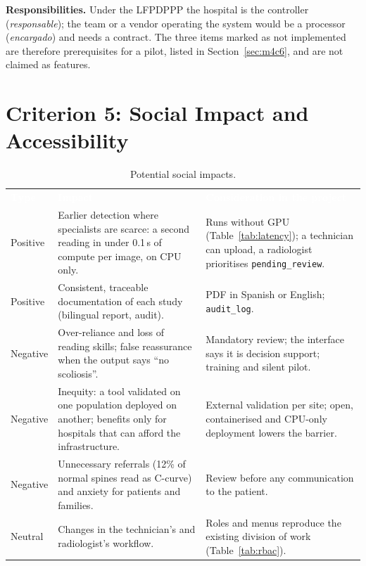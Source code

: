 \documentclass[12pt,a4paper]{article}
\newcommand{\hd}[1]{\textcolor{white}{\textbf{#1}}}
\begin{document}
\noindent\textbf{Responsibilities.} Under the LFPDPPP the hospital is the controller (\emph{responsable}); the team or a vendor operating the system would be a processor (\emph{encargado}) and needs a contract.
The three items marked as not implemented are therefore prerequisites for a pilot, listed in Section~\ref{sec:m4c6}, and are not claimed as features.

\section{Criterion 5: Social Impact and Accessibility}
\label{sec:m4c5}

\begin{table}[H]
\centering
\caption{Potential social impacts.}
\label{tab:social}
\renewcommand{\arraystretch}{1.25}
\begin{tabularx}{\textwidth}{L{2.0cm} Y Y}
\hd{Type} & \hd{Impact} & \hd{Consideration in the project} \\
Positive & Earlier detection where specialists are scarce: a second reading in under 0.1\,s of compute per image, on CPU only. & Runs without GPU (Table~\ref{tab:latency}); a technician can upload, a radiologist prioritises \texttt{pending\_review}. \\
Positive & Consistent, traceable documentation of each study (bilingual report, audit). & PDF in Spanish or English; \texttt{audit\_log}. \\
Negative & Over-reliance and loss of reading skills; false reassurance when the output says ``no scoliosis''. & Mandatory review; the interface says it is decision support; training and silent pilot. \\
Negative & Inequity: a tool validated on one population deployed on another; benefits only for hospitals that can afford the infrastructure. & External validation per site; open, containerised and CPU-only deployment lowers the barrier. \\
Negative & Unnecessary referrals (12\% of normal spines read as C-curve) and anxiety for patients and families. & Review before any communication to the patient. \\
Neutral & Changes in the technician's and radiologist's workflow. & Roles and menus reproduce the existing division of work (Table~\ref{tab:rbac}). \\
\end{tabularx}
\end{table}
\end{document}
